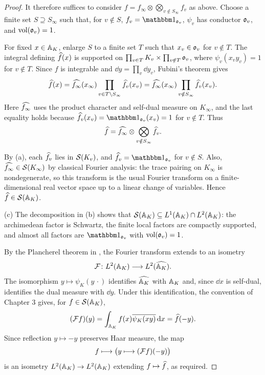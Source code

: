 \begin{proof}
It therefore suffices to consider $f = f_\infty \otimes \bigotimes_{v \notin S_\infty} f_v$ as above.
Choose a finite set $S \supseteq S_\infty$ such that, for $v \notin S$, $f_v = \bbone_{\gotho_v}$,
$\psi_v$ has conductor $\mathfrak{o}_v$, and $\operatorname{vol}(\mathfrak{o}_v) = 1$.

For fixed $x \in \mathbb{A}_K$, enlarge $S$ to a finite set $T$ such that $x_v \in \mathfrak{o}_v$ for
$v \notin T$. The integral defining $\widehat{f}(x)$ is supported on
$\prod_{v \in T} K_v \times \prod_{v \notin T} \mathfrak{o}_v$, where $\psi_v(x_v y_v) = 1$ for
$v \notin T$. Since $f$ is integrable and $\dd y = \prod_v \dd y_v$, Fubini's theorem gives
\[\widehat{f}(x) = \widehat{f_\infty}(x_\infty)
\prod_{v \in T \setminus S_\infty} \widehat{f_v}(x_v)
= \widehat{f_\infty}(x_\infty) \prod_{v \notin S_\infty} \widehat{f_v}(x_v). \]
Here $\widehat{f_\infty}$ uses the product character and self-dual measure on $K_\infty$, and the
last equality holds because $\dual{f_v}(x_v) = \bbone_{\gotho_v}(x_v) = 1$ for $v \notin T$. Thus
\[\widehat{f} = \widehat{f_\infty} \otimes \bigotimes_{v \notin S_\infty} \widehat{f_v}. \]

By (a), each $\widehat{f_v}$ lies in $\mathcal{S}(K_v)$, and $\dual{f_v} = \bbone_{\gotho_v}$ for
$v \notin S$. Also, $\widehat{f_\infty} \in \mathcal{S}(K_\infty)$ by classical Fourier analysis:
the trace pairing on $K_\infty$ is nondegenerate, so this transform is the usual Fourier transform
on a finite-dimensional real vector space up to a linear change of variables. Hence
$\widehat{f} \in \mathcal{S}(\mathbb{A}_K)$.

(c) The decomposition in (b) shows that $\mathcal{S}(\mathbb{A}_K) \subseteq L^1(\mathbb{A}_K) \cap L^2(\mathbb{A}_K)$:
the archimedean factor is Schwartz, the finite local factors are compactly supported, and almost
all factors are $\bbone_{\gotho_v}$ with $\operatorname{vol}(\mathfrak{o}_v) = 1$.

By the Plancherel theorem in , the Fourier transform extends to an isometry
\[\mathcal{F} \colon L^2(\mathbb{A}_K) \longrightarrow L^2(\widehat{\mathbb{A}_K}). \]
The isomorphism $y \mapsto \psi_K(y \, \cdot)$ identifies $\widehat{\mathbb{A}_K}$ with $\mathbb{A}_K$ and,
since $\dd x$ is self-dual, identifies the dual measure with $\dd y$. Under this identification,
the convention of Chapter 3 gives, for $f \in \mathcal{S}(\mathbb{A}_K)$,
\[(\mathcal{F} f)(y) = \int_{\mathbb{A}_K} f(x) \overline{\psi_K(xy)} \mathop{}\!\mathrm{d} x = \widehat{f}(-y). \]
Since reflection $y \mapsto -y$ preserves Haar measure, the map
\[f \longmapsto \bigl(y \longmapsto (\mathcal{F} f)(-y)\bigr)\]
is an isometry $L^2(\mathbb{A}_K) \to L^2(\mathbb{A}_K)$ extending $f \mapsto \widehat{f}$, as required.
\end{proof}

